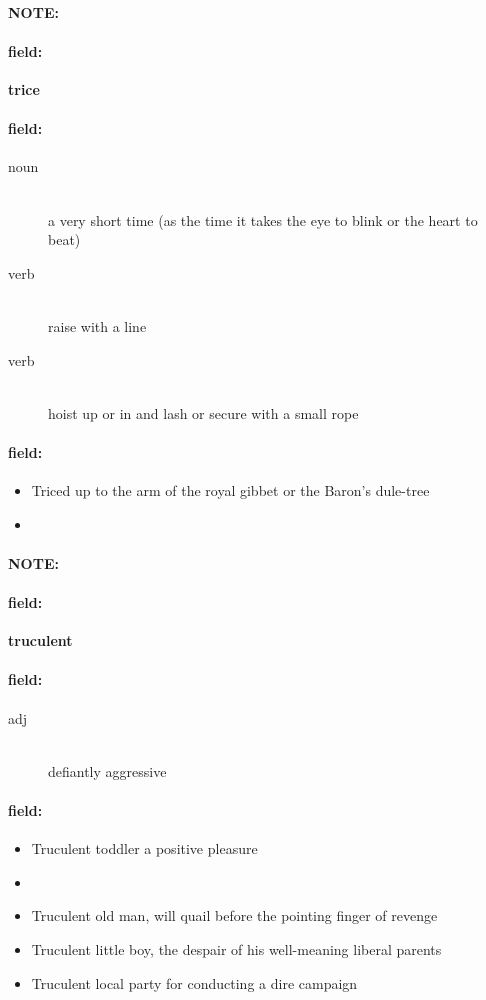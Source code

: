 \documentclass[12pt]{article}
\newenvironment{note}{\paragraph{NOTE:}}{}
\newenvironment{field}{\paragraph{field:}}{}
\begin{document}
\begin{note}
\begin{field}
\textbf{\large trice}
\end{field}


\begin{field}
\begin{description}
\item[noun] \hfill \\ 
a very short time (as the time it takes the eye to blink or the heart to beat)

\item[verb] \hfill \\ 
raise with a line

\item[verb] \hfill \\ 
hoist up or in and lash or secure with a small rope

\end{description}
\end{field}

\begin{field}
\begin{itemize}
\item Triced up to the arm of the royal gibbet or the Baron's dule-tree
\item 
\end{itemize}
\end{field}
\end{note}
\begin{note}
\begin{field}
\textbf{\large truculent}
\end{field}


\begin{field}
\begin{description}
\item[adj] \hfill \\ 
defiantly aggressive

\end{description}
\end{field}

\begin{field}
\begin{itemize}
\item Truculent toddler a positive pleasure
\item 
\item Truculent old man, will quail before the pointing finger of revenge
\item Truculent little boy, the despair of his well-meaning liberal parents
\item Truculent local party for conducting a dire campaign
\end{itemize}
\end{field}
\end{note}
\end{document}
